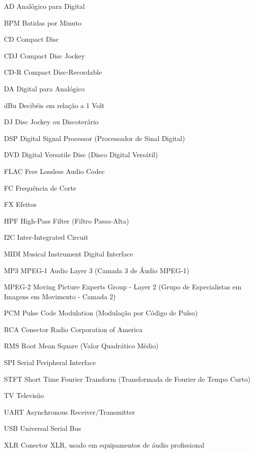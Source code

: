 \begin{siglas}
    \item[AD] Analógico para Digital
    \item[BPM] Batidas por Minuto
    \item[CD] Compact Disc
    \item[CDJ] Compact Disc Jockey
    \item[CD-R] Compact Disc-Recordable
    \item[DA] Digital para Analógico
    \item[dBu] Decibéis em relação a 1 Volt
    \item[DJ] Disc Jockey ou Discoterário
    \item[DSP] Digital Signal Processor (Processador de Sinal Digital)
    \item[DVD] Digital Versatile Disc (Disco Digital Versátil)
    \item[FLAC] Free Lossless Audio Codec
    \item[FC] Frequência de Corte
    \item[FX] Efeitos
    \item[HPF] High-Pass Filter (Filtro Passa-Alta)
    \item[I2C] Inter-Integrated Circuit
    \item[MIDI] Musical Instrument Digital Interface
    \item[MP3] MPEG-1 Audio Layer 3 (Camada 3 de Áudio MPEG-1)
    \item[MPEG-2] Moving Picture Experts Group - Layer 2 (Grupo de Especialistas em Imagens em Movimento - Camada 2)
    \item[PCM] Pulse Code Modulation (Modulação por Código de Pulso)
    \item[RCA] Conector Radio Corporation of America
    \item[RMS] Root Mean Square (Valor Quadrático Médio)
    \item[SPI] Serial Peripheral Interface
    \item[STFT] Short Time Fourier Transform (Transformada de Fourier de Tempo Curto)
    \item[TV] Televisão
    \item[UART] Asynchronous Receiver/Transmitter
    \item[USB] Universal Serial Bus
    \item[XLR] Conector XLR, usado em equipamentos de áudio profissional
\end{siglas}
